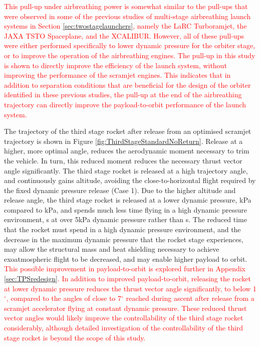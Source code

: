 \textcolor{red}{
 This pull-up under airbreathing power is somewhat similar to the pull-ups that were observed in some of the previous studies of multi-stage airbreathing launch systems in Section \ref{sec:twostagelaunchers}, namely the LaRC Turboramjet\cite{Wilhite1991}, the JAXA TSTO Spaceplane\cite{Fujikawa2017}, and the XCALIBUR\cite{Bradford2002}. However, all of these pull-ups were either performed specifically to lower dynamic pressure for the orbiter stage\cite{Wilhite1991,Bradford2002}, or to improve the operation of the airbreathing engines\cite{Fujikawa2017}. The pull-up in this study is shown to directly improve the efficiency of the launch system, without improving the performance of the scramjet engines. This indicates that in addition to separation conditions that are beneficial for the design of the orbiter identified in these previous studies, the pull-up at the end of the airbreathing trajectory can directly improve the payload-to-orbit performance of the launch system. }

The trajectory of the third stage rocket after release from an optimised scramjet trajectory is shown in Figure \ref{fig:ThirdStageStandardNoReturn}. Release at a higher, more optimal angle, reduces the aerodynamic moment necessary to trim the vehicle. In turn, this reduced moment reduces the necessary thrust vector angle significantly. The third stage rocket is released at a high trajectory angle, and continuously gains altitude, avoiding the close-to-horizontal flight required by the fixed dynamic pressure release (Case 1).
Due to the higher altitude and release angle, the third stage rocket is released at a lower dynamic pressure, \secondthirdSeparationqCdStandardNoReturn kPa compared to \secondthirdSeparationqConstqNoReturn kPa, and spends much less time flying in a high dynamic pressure environment, \thirdqOverFiveStandard s at over 5kPa dynamic pressure rather than \thirdqOverFiveConstqNoReturn s. 
The reduced time that the rocket must spend in a high dynamic pressure environment, and the decrease in the maximum dynamic pressure that the rocket stage experiences, may allow the structural mass and heat shielding necessary to achieve exoatmospheric flight to be decreased, and may enable higher payload to orbit. \textcolor{red}{This possible improvement in payload-to-orbit is explored further in Appendix \ref{sec:TPSredesign}. In addition to improved payload-to-orbit, releasing the rocket at lower dynamic pressure reduces the thrust vector angle significantly, to below 1$^\circ$, compared to the angles of close to 7$^\circ$ reached during ascent after release from a scramjet accelerator flying at constant dynamic pressure. These reduced thrust vector angles would likely improve the controllability of the third stage rocket considerably, although detailed investigation of the controllability of the third stage rocket is beyond the scope of this study.} 


